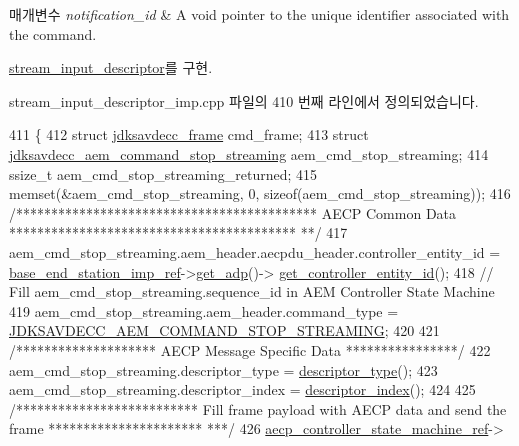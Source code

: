 \begin{DoxyParams}{매개변수}
{\em notification\+\_\+id} & A void pointer to the unique identifier associated with the command. \\
\hline
\end{DoxyParams}


\hyperlink{classavdecc__lib_1_1stream__input__descriptor_a3a5df38802b65e88b6adb330361e4fdf}{stream\+\_\+input\+\_\+descriptor}를 구현.



stream\+\_\+input\+\_\+descriptor\+\_\+imp.\+cpp 파일의 410 번째 라인에서 정의되었습니다.


\begin{DoxyCode}
411 \{
412     \textcolor{keyword}{struct }\hyperlink{structjdksavdecc__frame}{jdksavdecc\_frame} cmd\_frame;
413     \textcolor{keyword}{struct }\hyperlink{structjdksavdecc__aem__command__stop__streaming}{jdksavdecc\_aem\_command\_stop\_streaming} 
      aem\_cmd\_stop\_streaming;
414     ssize\_t aem\_cmd\_stop\_streaming\_returned;
415     memset(&aem\_cmd\_stop\_streaming, 0, \textcolor{keyword}{sizeof}(aem\_cmd\_stop\_streaming));
416     \textcolor{comment}{/******************************************* AECP Common Data *****************************************
      **/}
417     aem\_cmd\_stop\_streaming.aem\_header.aecpdu\_header.controller\_entity\_id = 
      \hyperlink{classavdecc__lib_1_1descriptor__base__imp_a550c969411f5f3b69f55cc139763d224}{base\_end\_station\_imp\_ref}->\hyperlink{classavdecc__lib_1_1end__station__imp_a471a74540ce6182fad0c17dfd010107e}{get\_adp}()->
      \hyperlink{classavdecc__lib_1_1adp_a0c0959a46658c0a22e9530334b2912da}{get\_controller\_entity\_id}();
418     \textcolor{comment}{// Fill aem\_cmd\_stop\_streaming.sequence\_id in AEM Controller State Machine}
419     aem\_cmd\_stop\_streaming.aem\_header.command\_type = 
      \hyperlink{group__command_ga662d8e95498967710f7f3a281987fd6c}{JDKSAVDECC\_AEM\_COMMAND\_STOP\_STREAMING};
420 
421     \textcolor{comment}{/******************** AECP Message Specific Data ****************/}
422     aem\_cmd\_stop\_streaming.descriptor\_type = \hyperlink{classavdecc__lib_1_1descriptor__base__imp_aefc543029ab093823c3f5b9d84f0ccc4}{descriptor\_type}();
423     aem\_cmd\_stop\_streaming.descriptor\_index = \hyperlink{classavdecc__lib_1_1descriptor__base__imp_ac23c0a35276c07cfce8c8660700c2135}{descriptor\_index}();
424 
425     \textcolor{comment}{/************************** Fill frame payload with AECP data and send the frame **********************
      ***/}
426     \hyperlink{namespaceavdecc__lib_a0b1b5aea3c0490f77cbfd9178af5be22}{aecp\_controller\_state\_machine\_ref}->

\end{DoxyCode}
